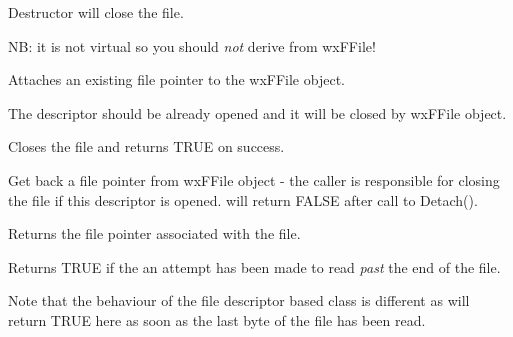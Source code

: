 





Destructor will close the file.

NB: it is not virtual so you should {\it not} derive from wxFFile!

\label{wxffileattach}


Attaches an existing file pointer to the wxFFile object.

The descriptor should be already opened and it will be closed by wxFFile
object.

\label{wxffileclose}


Closes the file and returns TRUE on success.

\label{wxffiledetach}


Get back a file pointer from wxFFile object - the caller is responsible for closing the file if this
descriptor is opened.  will return FALSE after call to Detach().

\label{wxffilefp}


Returns the file pointer associated with the file.

\label{wxffileeof}


Returns TRUE if the an attempt has been made to read {\it past}
the end of the file. 

Note that the behaviour of the file descriptor based class
 is different as 
will return TRUE here as soon as the last byte of the file has been
read.

